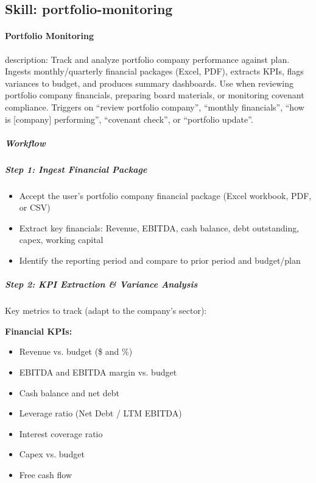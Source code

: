 \documentclass[11pt]{article}
\begin{document}
\subsection{Skill: portfolio-monitoring}\label{file:skills-portfolio-monitoring-SKILL.md}

\paragraph{Portfolio Monitoring}\mbox{}\par

description: Track and analyze portfolio company performance against plan. Ingests monthly/quarterly financial packages (Excel, PDF), extracts KPIs, flags variances to budget, and produces summary dashboards. Use when reviewing portfolio company financials, preparing board materials, or monitoring covenant compliance. Triggers on ``review portfolio company'', ``monthly financials'', ``how is [company] performing'', ``covenant check'', or ``portfolio update''.


\subparagraph{Workflow}\mbox{}\par

\subparagraph{Step 1: Ingest Financial Package}\mbox{}\par

\begin{itemize}[leftmargin=*,itemsep=2pt,topsep=2pt]
\item {} Accept the user's portfolio company financial package (Excel workbook, PDF, or CSV)
\item {} Extract key financials: Revenue, EBITDA, cash balance, debt outstanding, capex, working capital
\item {} Identify the reporting period and compare to prior period and budget/plan
\end{itemize}

\subparagraph{Step 2: KPI Extraction \& Variance Analysis}\mbox{}\par

Key metrics to track (adapt to the company's sector):


\textbf{Financial KPIs:}

\begin{itemize}[leftmargin=*,itemsep=2pt,topsep=2pt]
\item {} Revenue vs. budget (\$ and \%)
\item {} EBITDA and EBITDA margin vs. budget
\item {} Cash balance and net debt
\item {} Leverage ratio (Net Debt / LTM EBITDA)
\item {} Interest coverage ratio
\item {} Capex vs. budget
\item {} Free cash flow
\end{itemize}
\end{document}
